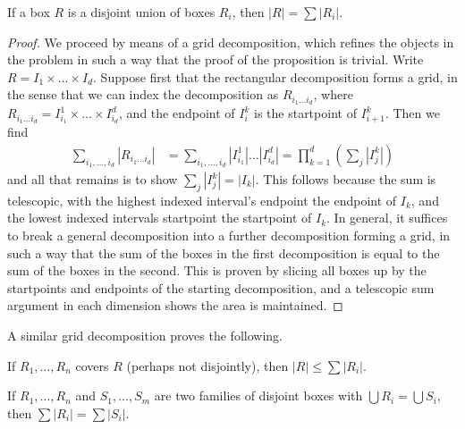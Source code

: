 \begin{lemma}
    If a box $R$ is a disjoint union of boxes $R_i$, then $|R| = \sum |R_i|$.
\end{lemma}
\begin{proof}
    We proceed by means of a grid decomposition, which refines the objects in the problem in such a way that the proof of the proposition is trivial. Write $R = I_1 \times \dots \times I_d$. Suppose first that the rectangular decomposition forms a grid, in the sense that we can index the decomposition as $R_{i_1 \dots i_d}$, where $R_{i_1 \dots i_d} = I^1_{i_1} \times \dots \times I^d_{i_d}$, and the endpoint of $I^k_i$ is the startpoint of $I^k_{i+1}$. Then we find
    \begin{align*}
        \sum_{i_1, \dots, i_d} |R_{i_1 \dots i_d}| &= \sum_{i_1, \dots, i_d} |I^1_{i_1}| \dots |I^d_{i_d}| = \prod_{k = 1}^d \left( \sum_j |I^k_j| \right)
    \end{align*}
    and all that remains is to show $\sum_j |I^k_j| = |I_k|$. This follows because the sum is telescopic, with the highest indexed interval's endpoint the endpoint of $I_k$, and the lowest indexed intervals startpoint the startpoint of $I_k$. In general, it suffices to break a general decomposition into a further decomposition forming a grid, in such a way that the sum of the boxes in the first decomposition is equal to the sum of the boxes in the second. This is proven by slicing all boxes up by the startpoints and endpoints of the starting decomposition, and a telescopic sum argument in each dimension shows the area is maintained.
\end{proof}

A similar grid decomposition proves the following.

\begin{lemma}
    If $R_1, \dots, R_n$ covers $R$ (perhaps not disjointly), then $|R| \leq \sum |R_i|$.
\end{lemma}

\begin{lemma}
    If $R_1, \dots, R_n$ and $S_1, \dots, S_m$ are two families of disjoint boxes with $\bigcup R_i = \bigcup S_i$, then $\sum |R_i| = \sum |S_i|$.
\end{lemma}

